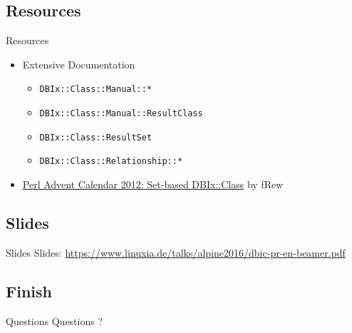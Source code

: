 \subsection{Resources}
\begin{frame}[fragile]{Resources}
\begin{itemize}
\item Extensive Documentation
\begin{itemize}
\item \verb|DBIx::Class::Manual::*|
\item \verb|DBIx::Class::Manual::ResultClass|
\item \verb|DBIx::Class::ResultSet|
\item \verb|DBIx::Class::Relationship::*|
\end{itemize}
\item \href{http://www.perladvent.org/2012/2012-12-21.html}
{Perl Advent Calendar 2012: Set-based DBIx::Class}
by fRew
\end{itemize}
\end{frame}

\subsection{Slides}

\begin{frame}{Slides}
Slides:
\url{https://www.linuxia.de/talks/alpine2016/dbic-pr-en-beamer.pdf}
\end{frame}

\subsection{Finish}

\begin{frame}{Questions}
\centering
Questions ?
\end{frame}



